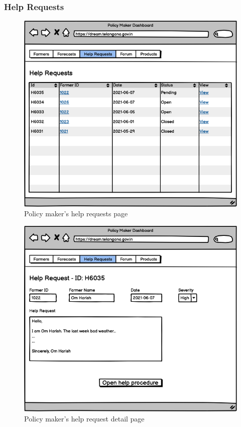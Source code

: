 \documentclass[10pt]{article} %
\begin{document}
\subsubsection{Help Requests}
\begin{figure}[h!]
    \centering
    \centerline{\includegraphics[scale=0.54]{images/uimockups/pm_helprequests.png}}
    \caption{Policy maker's help requests page}
    \label{fig:ui_pm_helprequests}
\end{figure}
\newpage

\begin{figure}[h!]
    \centering
    \centerline{\includegraphics[scale=0.54]{images/uimockups/pm_helprequestdetail.png}}
    \caption{Policy maker's help request detail page}
    \label{fig:ui_pm_helprequestdetail}
\end{figure}
\newpage
\end{document}
